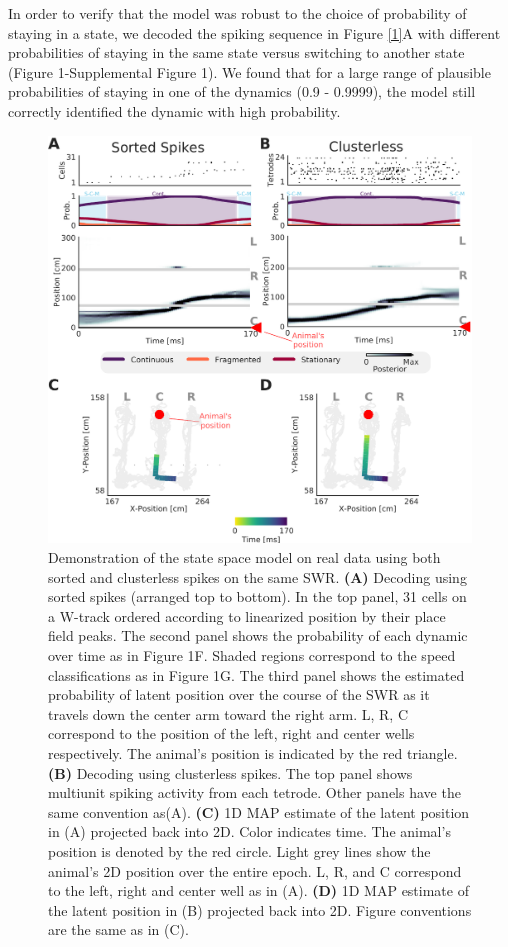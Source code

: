 \documentclass[times, twoside]{zHenriquesLab-StyleBioRxiv}
\begin{document}
In order to verify that the model was robust to the choice of probability of staying in a state, we decoded the spiking sequence in Figure \ref{1}A with different probabilities of staying in the same state versus switching to another state (Figure 1-Supplemental Figure 1). We found that for a large range of plausible probabilities of staying in one of the dynamics (0.9 - 0.9999), the model still correctly identified the dynamic with high probability.

\begin{figure}%
\centering
\includegraphics[width=0.80\linewidth]{figures/Figure2/Figure2_v4}
\caption{Demonstration of the state space model on real data using both sorted and clusterless spikes on the same SWR. \textbf{(A)} Decoding using sorted spikes (arranged top to bottom). In the top panel, 31 cells on a W-track ordered according to linearized position by their place field peaks. The second panel shows the probability of each dynamic over time as in Figure 1F. Shaded regions correspond to the speed classifications as in Figure 1G. The third panel shows the estimated probability of latent position over the course of the SWR as it travels down the center arm toward the right arm. L, R, C correspond to the position of the left, right and center wells respectively. The animal's position is indicated by the red triangle. \textbf{(B)} Decoding using clusterless spikes. The top panel shows multiunit spiking activity from each tetrode. Other panels have the same convention as(A).  \textbf{(C)} 1D MAP estimate of the latent position in (A) projected back into 2D. Color indicates time. The animal's position is denoted by the red circle. Light grey lines show the animal's 2D position over the entire epoch. L, R, and C correspond to the left, right and center well as in (A). \textbf{(D)} 1D MAP estimate of the latent position in (B) projected back into 2D. Figure conventions are the same as in (C).
}
\label{2}
\end{figure}
\end{document}
